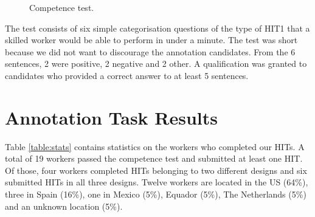 \documentclass[11pt, a4paper,onecolumn]{article}
\begin{document}
\begin{figure}[h]
  \begin{center}
	\caption{Competence test.}
	\label{comtest}
  \end{center}
\end{figure}


The test consists of six simple categorisation questions of the type of HIT1 that a skilled worker would be able to perform in under a minute. The test was short because we did not want to discourage the annotation candidates. From the 6 sentences, 2 were positive, 2 negative and 2 other. A qualification was granted to candidates who provided a correct answer to at least 5 sentences.

\newpage

\section{Annotation Task Results}
\label{sect:results}


Table \ref{table:stats} contains statistics on the workers who completed our HITs. A total of 19 workers passed the competence test and submitted at least one HIT. Of those, four workers completed HITs belonging to two different designs and six submitted HITs in all three designs. Twelve workers are located in the US (64\%), three in Spain (16\%), one in Mexico (5\%), Equador (5\%), The Netherlands (5\%) and an unknown location (5\%).
\end{document}
